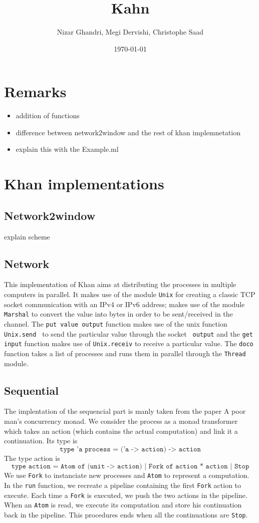 \documentclass[10pt,a4paper]{article}
\title{Kahn}
\author{Nizar Ghandri, Megi Dervishi, Christophe Saad}
\date{\today}
\begin{document}
\maketitle

\section{Remarks }
\begin{itemize}
\item addition of functions
\item difference between network2window and the rest of khan implemnetation
\item explain this with the Example.ml
\end{itemize}

\section{Khan implementations }
\subsection{Network2window}
explain scheme 

\subsection{Network}
This implementation of Khan aims at distributing the processes in multiple computers in parallel. It makes use of the module \texttt{Unix} for creating a classic TCP socket communication with an IPv4 or IPv6 address; makes use of the module \texttt{Marshal} to convert the value into bytes in order to be sent/received in the channel. The \texttt{put value output} function makes use of the unix function \texttt{Unix.send } to send the particular value through the socket \texttt{ output} and the \texttt{get input} function makes use of \texttt{Unix.receiv} to receive a particular value. The \texttt{doco} function takes a list of processes and runs them in parallel through the \texttt{Thread} module.

\subsection{Sequential}
The implentation of the sequencial part is manly taken from the paper  A poor man’s concurrency monad. We consider the process as a monad transformer which takes an action (which contains the actual computation) and link it a continuation. Its type is $$\texttt{type 'a process = ('a -> action) -> action}$$
The type action is $$\texttt{type action  = Atom of (unit -> action) | Fork of action * action | Stop}$$
We use \texttt{Fork} to instanciate new processes and \texttt{Atom} to represent a computation.\\
In the \texttt{run} function, we recreate a pipeline containing the first \texttt{Fork} action to execute. Each time a \texttt{Fork} is executed, we push the two actions in the pipeline. When an \texttt{Atom} is read, we execute its computation and store his continuation back in the pipeline. This procedures ends when all the continuations are \texttt{Stop}.
\end{document}
